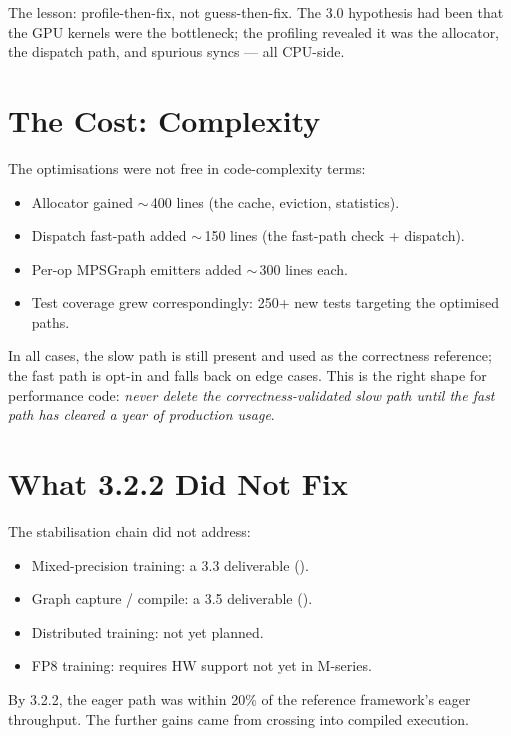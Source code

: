 The lesson: profile-then-fix, not guess-then-fix. The 3.0
hypothesis had been that the GPU kernels were the bottleneck;
the profiling revealed it was the allocator, the dispatch path,
and spurious syncs --- all CPU-side.

\section{The Cost: Complexity}
\label{sec:stabilization:complexity_cost}

The optimisations were not free in code-complexity terms:

\begin{itemize}
  \item Allocator gained \(\sim\)\,400 lines (the cache,
    eviction, statistics).
  \item Dispatch fast-path added \(\sim\)\,150 lines (the
    fast-path check + dispatch).
  \item Per-op MPSGraph emitters added \(\sim\)\,300 lines each.
  \item Test coverage grew correspondingly: 250+ new tests
    targeting the optimised paths.
\end{itemize}

In all cases, the slow path is still present and used as the
correctness reference; the fast path is opt-in and falls back
on edge cases. This is the right shape for performance code:
\emph{never delete the correctness-validated slow path until
the fast path has cleared a year of production usage}.

\section{What 3.2.2 Did Not Fix}
\label{sec:stabilization:not_fixed}

The stabilisation chain did not address:

\begin{itemize}
  \item Mixed-precision training: a 3.3 deliverable
    ().
  \item Graph capture / compile: a 3.5 deliverable
    ().
  \item Distributed training: not yet planned.
  \item FP8 training: requires HW support not yet in M-series.
\end{itemize}

By 3.2.2, the eager path was within 20\% of the reference
framework's eager throughput. The further gains came from
crossing into compiled execution.

